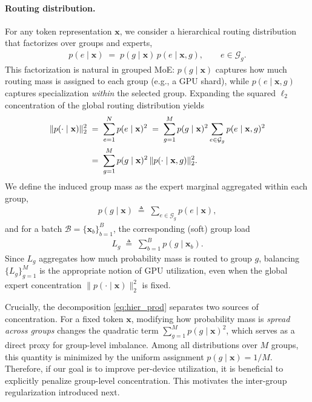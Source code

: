 \documentclass[sigconf,nonacm]{acmart}
\begin{document}
\paragraph{Routing distribution.} For any token representation $\mathbf{x}$, we consider a hierarchical routing distribution that factorizes over groups and experts,
\begin{align}
p(e \mid \mathbf{x})
\;=\;
p(g \mid \mathbf{x})\, p(e \mid \mathbf{x}, g),
\qquad e \in \mathcal{G}_g .
\label{eq:hier_prod}
\end{align}
This factorization is natural in grouped MoE: $p(g\mid \mathbf{x})$ captures how much routing mass is assigned to each group (e.g., a GPU shard), while $p(e\mid \mathbf{x}, g)$ captures specialization \emph{within} the selected group.
Expanding the squared $\ell_2$ concentration of the global routing distribution yields
\begin{align}
\|p(\cdot \mid \mathbf{x})\|_2^2
&\;=\;
\sum_{e=1}^N p(e \mid \mathbf{x})^2
\;=\;
\sum_{g=1}^M p(g \mid \mathbf{x})^2 \sum_{e \in \mathcal{G}_g} p(e \mid \mathbf{x}, g)^2 \notag\\
&\;=\;
\sum_{g=1}^M p(g \mid \mathbf{x})^2 \, \|p(\cdot \mid \mathbf{x}, g)\|_2^2 .
\label{eq:l2_decomp}
\end{align}
We define the induced group mass as the expert marginal aggregated within each group,
\begin{align*}
p(g \mid \mathbf{x})
\;\triangleq\;
\sum_{e \in \mathcal{G}_g} p(e \mid \mathbf{x}),
\end{align*}
and for a batch $\mathcal{B}=\{\mathbf{x}_b\}_{b=1}^B$, the corresponding (soft) group load
\begin{align*}
L_g
\;\triangleq\;
\sum_{b=1}^B p(g \mid \mathbf{x}_b).
\end{align*}
Since $L_g$ aggregates how much probability mass is routed to group $g$, balancing $\{L_g\}_{g=1}^M$ is the appropriate notion of GPU utilization, even when the global expert concentration $\|p(\cdot \mid \mathbf{x})\|_2^2$ is fixed.

Crucially, the decomposition \eqref{eq:hier_prod} separates two sources of concentration.
For a fixed token $\mathbf{x}$, modifying how probability mass is \emph{spread across groups} changes the quadratic term $\sum_{g=1}^M p(g \mid \mathbf{x})^2$, which serves as a direct proxy for group-level imbalance.
Among all distributions over $M$ groups, this quantity is minimized by the uniform assignment $p(g \mid \mathbf{x})=1/M$. Therefore, if our goal is to improve per-device utilization, it is beneficial to explicitly penalize group-level concentration.
This motivates the inter-group regularization introduced next.
\end{document}
